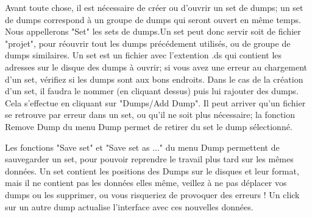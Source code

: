 Avant toute chose, il est nécessaire de créer ou d'ouvrir un set de dumps; un set de dumps correspond à un groupe de dumps qui seront ouvert en même temps. Nous appellerons "Set" les sets de dumps.Un set peut donc servir soit de fichier "projet", pour réouvrir tout les dumps précédement utilisés, ou de groupe de dumps similaires.
Un set est un fichier avec l'extention .ds qui contient les adresses sur le disque des dumps à ouvrir; si vous avez une erreur au chargement d'un set, vérifiez si les dumps sont aux bons endroits.
Dans le cas de la création d'un set, il faudra le nommer (en cliquant dessus) puis lui rajouter des dumps. Cela s'effectue en cliquant sur "Dumps/Add Dump".
Il peut arriver qu'un fichier se retrouve par erreur dans un set, ou qu'il ne soit plus nécessaire; la fonction Remove Dump du menu Dump permet de retirer du set le dump sélectionné.


Les fonctions "Save set" et "Save set as ..." du menu Dump permettent de sauvegarder un set, pour pouvoir reprendre le travail plus tard sur les mêmes données. Un set contient les positions des Dumps sur le disques et leur format, mais il ne contient pas les données elles même, veillez à ne pas déplacer vos dumps ou les supprimer, ou vous risqueriez de provoquer des erreurs !
Un click sur un autre dump actualise l'interface avec ces nouvelles données.